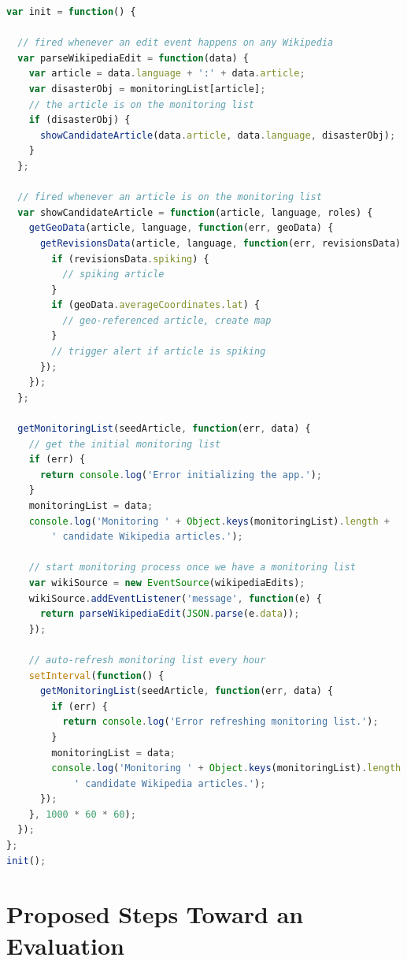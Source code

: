 \documentclass[letterpaper]{article}
\begin{document}
\begin{lstlisting}[caption={Monitoring loop of the natural disaster monitor},
  label=listing:monitoring, language=JavaScript,
  float=b!, stringstyle=\color{gray},morekeywords={for,if,console,log,addEventListener,JSON,parse,stringify,forEach}]
var init = function() {

  // fired whenever an edit event happens on any Wikipedia
  var parseWikipediaEdit = function(data) {
    var article = data.language + ':' + data.article;
    var disasterObj = monitoringList[article];
    // the article is on the monitoring list
    if (disasterObj) {    
      showCandidateArticle(data.article, data.language, disasterObj);
    }
  };
  
  // fired whenever an article is on the monitoring list
  var showCandidateArticle = function(article, language, roles) {
    getGeoData(article, language, function(err, geoData) {
      getRevisionsData(article, language, function(err, revisionsData) {
        if (revisionsData.spiking) {
          // spiking article
        }
        if (geoData.averageCoordinates.lat) {
          // geo-referenced article, create map
        }
        // trigger alert if article is spiking
      });
    });
  };  

  getMonitoringList(seedArticle, function(err, data) {
    // get the initial monitoring list
    if (err) {
      return console.log('Error initializing the app.');
    }
    monitoringList = data;
    console.log('Monitoring ' + Object.keys(monitoringList).length +
        ' candidate Wikipedia articles.');
    
    // start monitoring process once we have a monitoring list
    var wikiSource = new EventSource(wikipediaEdits);
    wikiSource.addEventListener('message', function(e) {
      return parseWikipediaEdit(JSON.parse(e.data));
    });
    
    // auto-refresh monitoring list every hour
    setInterval(function() {
      getMonitoringList(seedArticle, function(err, data) {
        if (err) {
          return console.log('Error refreshing monitoring list.');
        }
        monitoringList = data;
        console.log('Monitoring ' + Object.keys(monitoringList).length +
            ' candidate Wikipedia articles.');
      });
    }, 1000 * 60 * 60);
  });
};
init();
\end{lstlisting}

\section{Proposed Steps Toward an Evaluation}
\label{sec:Evaluation}
\end{document}
